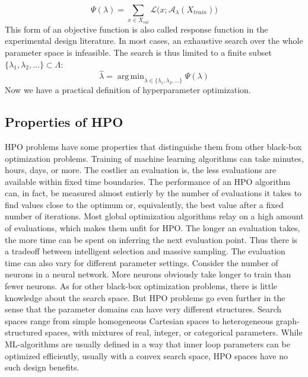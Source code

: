\documentclass[english]{article}
\DeclareMathOperator*{\argmin}{arg\,min}
\begin{document}
\begin{equation}
  \Psi(\lambda) = \sum_{x \in X_{val}} \mathcal{L}\big(x;\mathcal{A}_\lambda(X_{train})\big)
\end{equation}
This form of an objective function is also called response function in the experimental design literature. In most cases, an exhaustive search over the whole parameter space is infeasible. The search is thus limited to a finite subset $\{\lambda_1, \lambda_2, ... \} \subset \Lambda$:
\begin{equation}
  \hat{\lambda} = \argmin_{\lambda \in \{\lambda_1, \lambda_2, ... \}} \Psi(\lambda)
\label{empirical hypa_opt_1}
\end{equation}
Now we have a practical definition of hyperparameter optimization.

\subsection{Properties of HPO}
HPO problems have some properties that distinguishe them from other black-box optimization problems. Training of machine learning algorithms can take minutes, hours, days, or more. The costlier an evaluation is, the less evaluations are available within fixed time boundaries. The performance of an HPO algorithm can, in fact, be measured almost entierly by the number of evaluations it takes to find values close to the optimum or, equivalently, the best value after a fixed number of iterations. Most global optimization algorithms relay on a high amount of evaluations, which makes them unfit for HPO. The longer an evaluation takes, the more time can be spent on inferring the next evaluation point. Thus there is a tradeoff between intelligent selection and massive sampling. The evaluation time can also vary for different parameter settings. Consider the number of neurons in a neural network. More neurons obviously take longer to train than fewer neurons.
As for other black-box optimization problems, there is little knowledge about the search space. But HPO problems go even further in the sense that the parameter domains can have very different structures. Search spaces range from simple homogeneous Cartesian spaces to heterogeneous graph-structured spaces, with mixtures of real, integer, or categorical parameters. While ML-algorithms are usually defined in a way that inner loop parameters can be optimized efficiently, usually with a convex search space, HPO spaces have no such design benefits.
\end{document}
